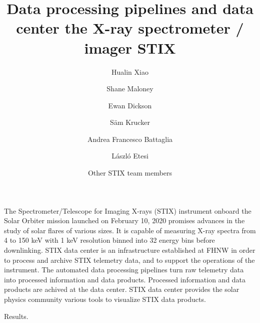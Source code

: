 \documentclass{aa}
\begin{document}
 


   \title{Data processing pipelines and data center the X-ray spectrometer / imager STIX}

   \subtitle{}

   \author{Hualin Xiao
          \and 
          Shane Maloney 
          \and 
          Ewan Dickson 
          \and 
          S\"am Krucker
          \and Andrea Francesco Battaglia
            \and László Etesi 
          \and Other STIX team members
         }


   \date{}

 
  \abstract
   {} %
   { The Spectrometer/Telescope for Imaging X-rays (STIX) instrument onboard the Solar Orbiter mission launched on February 10, 2020 promises advances in the study of solar flares of various sizes. It is capable of measuring X-ray spectra from 4 to 150 keV with 1 keV resolution binned into 32 energy bins before downlinking. STIX data center is an infrastructure established at FHNW in order to process and archive STIX telemetry data, and to support the operations of the instrument. The automated data processing pipelines turn raw telemetry data into processed information and data products. Processed information and data products are achived at the data center.  STIX data center provides the solar physics community various tools to visualize STIX data products.
   }

   {Results.}
   {}

\end{document}
